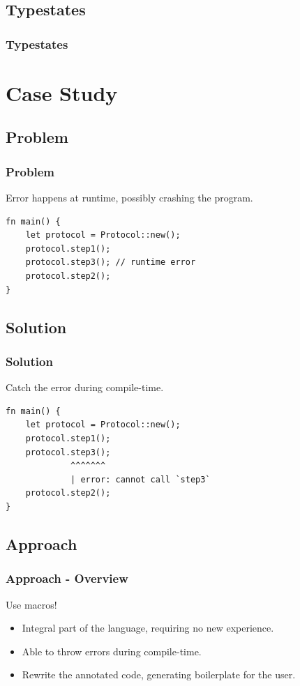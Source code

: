 \documentclass[bigger,notes]{beamer}
\begin{document}
\subsection{Typestates}
\begin{frame}
    \frametitle{Typestates}

\end{frame}

\section{Case Study}

\subsection{Problem}
\begin{frame}[fragile]
    \frametitle{Problem} %
    Error happens at runtime, possibly crashing the program.

    \begin{verbatim}
fn main() {
    let protocol = Protocol::new();
    protocol.step1();
    protocol.step3(); // runtime error
    protocol.step2();
}
    \end{verbatim}

\end{frame}

\subsection{Solution}
\begin{frame}[fragile]
    \frametitle{Solution}
    Catch the error during compile-time.
    \begin{verbatim}
fn main() {
    let protocol = Protocol::new();
    protocol.step1();
    protocol.step3();
             ^^^^^^^
             | error: cannot call `step3`
    protocol.step2();
}
    \end{verbatim}

\end{frame}

\subsection{Approach}
\begin{frame}
    \frametitle{Approach - Overview}

    Use macros!
    \begin{itemize}
        \item Integral part of the language, requiring no new experience.
        \item Able to throw errors during compile-time.
        \item Rewrite the annotated code, generating boilerplate for the user.
    \end{itemize}

\end{frame}
\end{document}
